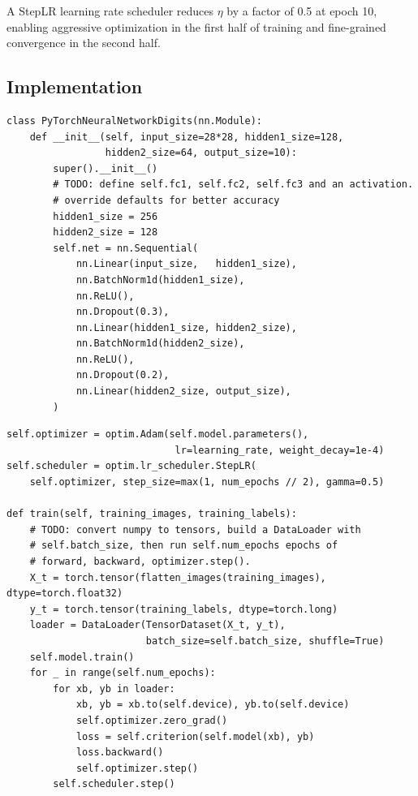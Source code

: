 \documentclass[12pt]{article}
\begin{document}
A StepLR learning rate scheduler reduces $\eta$ by a factor of 0.5 at epoch 10,
enabling aggressive optimization in the first half of training and fine-grained
convergence in the second half.

\subsection{Implementation}

\begin{lstlisting}[caption={PyTorch network definition (\texttt{q1c\_neural\_net\_pytorch\_digits.py})}, label=lst:torch]
class PyTorchNeuralNetworkDigits(nn.Module):
    def __init__(self, input_size=28*28, hidden1_size=128,
                 hidden2_size=64, output_size=10):
        super().__init__()
        # TODO: define self.fc1, self.fc2, self.fc3 and an activation.
        # override defaults for better accuracy
        hidden1_size = 256
        hidden2_size = 128
        self.net = nn.Sequential(
            nn.Linear(input_size,   hidden1_size),
            nn.BatchNorm1d(hidden1_size),
            nn.ReLU(),
            nn.Dropout(0.3),
            nn.Linear(hidden1_size, hidden2_size),
            nn.BatchNorm1d(hidden2_size),
            nn.ReLU(),
            nn.Dropout(0.2),
            nn.Linear(hidden2_size, output_size),
        )
\end{lstlisting}

\begin{lstlisting}[caption={Adam optimizer configuration and training loop (\texttt{q1c\_neural\_net\_pytorch\_digits.py})}, label=lst:torch2]
self.optimizer = optim.Adam(self.model.parameters(),
                             lr=learning_rate, weight_decay=1e-4)
self.scheduler = optim.lr_scheduler.StepLR(
    self.optimizer, step_size=max(1, num_epochs // 2), gamma=0.5)

def train(self, training_images, training_labels):
    # TODO: convert numpy to tensors, build a DataLoader with
    # self.batch_size, then run self.num_epochs epochs of
    # forward, backward, optimizer.step().
    X_t = torch.tensor(flatten_images(training_images), dtype=torch.float32)
    y_t = torch.tensor(training_labels, dtype=torch.long)
    loader = DataLoader(TensorDataset(X_t, y_t),
                        batch_size=self.batch_size, shuffle=True)
    self.model.train()
    for _ in range(self.num_epochs):
        for xb, yb in loader:
            xb, yb = xb.to(self.device), yb.to(self.device)
            self.optimizer.zero_grad()
            loss = self.criterion(self.model(xb), yb)
            loss.backward()
            self.optimizer.step()
        self.scheduler.step()
\end{lstlisting}
\end{document}
